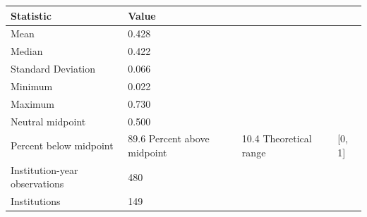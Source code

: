 \begin{tabular}{ll}
\toprule
Statistic & Value \\
\midrule
Mean & 0.428 \\
Median & 0.422 \\
Standard Deviation & 0.066 \\
Minimum & 0.022 \\
Maximum & 0.730 \\
Neutral midpoint & 0.500 \\
Percent below midpoint & 89.6%
Percent above midpoint & 10.4%
Theoretical range & [0, 1] \\
Institution-year observations & 480 \\
Institutions & 149 \\
\bottomrule
\end{tabular}
